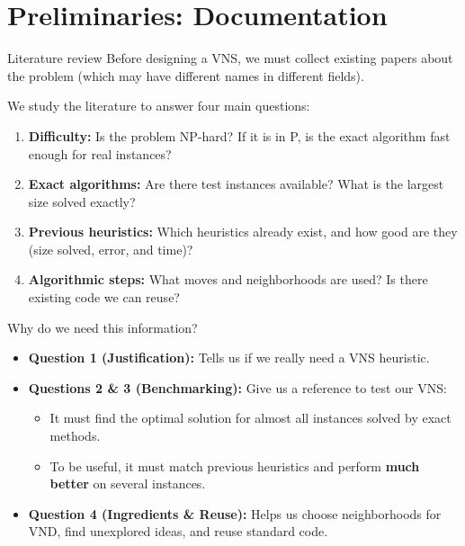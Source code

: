 \documentclass{beamer}
\begin{document}
\section{Preliminaries: Documentation}

\begin{frame}{Literature review}
\quad Before designing a VNS, we must collect existing papers about the problem (which may have different names in different fields).

\vspace{0.2cm}
We study the literature to answer four main questions:
\begin{enumerate}
\item \textbf{Difficulty:} Is the problem NP-hard? If it is in P, is the exact algorithm fast enough for real instances?
\item \textbf{Exact algorithms:} Are there test instances available? What is the largest size solved exactly?
\item \textbf{Previous heuristics:} Which heuristics already exist, and how good are they (size solved, error, and time)?
\item \textbf{Algorithmic steps:} What moves and neighborhoods are used? Is there existing code we can reuse?
\end{enumerate}
\end{frame}

\begin{frame}{Why do we need this information?}
\begin{itemize}
\item \textbf{Question 1 (Justification):} Tells us if we really need a VNS heuristic.
\vspace{0.2cm}
\item \textbf{Questions 2 \& 3 (Benchmarking):} Give us a reference to test our VNS:
    \begin{itemize}
    \item It must find the optimal solution for almost all instances solved by exact methods.
    \item To be useful, it must match previous heuristics and perform \textbf{much better} on several instances.
    \end{itemize}
\vspace{0.2cm}
\item \textbf{Question 4 (Ingredients \& Reuse):} Helps us choose neighborhoods for VND, find unexplored ideas, and reuse standard code.
\end{itemize}
\end{frame}
\end{document}
